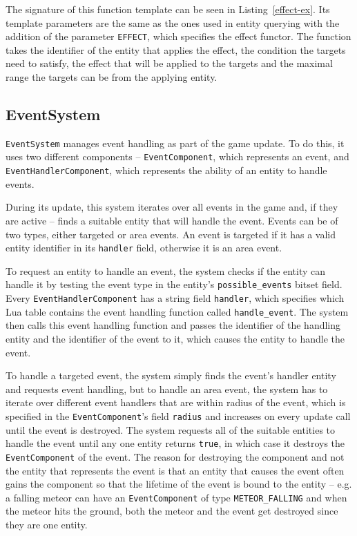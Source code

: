The signature of this function template can be seen in Listing~\ref{effect-ex}. Its template parameters are the same as the ones used
in entity querying with the addition of the parameter \texttt{EFFECT}, which specifies the effect functor. The function takes the
identifier of the entity that applies the effect, the condition the targets need to satisfy, the effect that will be applied to the
targets and the maximal range the targets can be from the applying entity.

\subsection{EventSystem}

\texttt{EventSystem} manages event handling as part of the game update. To do this, it uses two different components --
\texttt{EventComponent}, which represents an event, and \texttt{EventHandlerComponent}, which represents the ability of an entity
to handle events.

During its update, this system iterates over all events in the game and, if they are active -- finds a suitable entity that will
handle the event. Events can be of two types, either targeted or area events. An event is targeted if it has a valid entity
identifier in its \texttt{handler} field, otherwise it is an area event.

To request an entity to handle an event, the system checks if the entity can handle it by testing the event type in the entity's
\texttt{possible\_events} bitset field. Every \texttt{EventHandlerComponent} has a string field \texttt{handler}, which specifies
which Lua table contains the event handling function called \texttt{handle\_event}. The system then calls this event handling
function and passes the identifier of the handling entity and the identifier of the event to it, which causes the entity
to handle the event.

To handle a targeted event, the system simply finds the event's handler entity and requests event handling, but to handle an area event,
the system has to iterate over different event handlers that are within radius of the event, which is specified in the
\texttt{EventComponent}'s field \texttt{radius} and increases on every update call until the event is destroyed. The system requests
all of the suitable entities to handle the event until any one entity returns \texttt{true}, in which case it destroys the
\texttt{EventComponent} of the event. The reason for destroying the component and not the entity that represents the event is that
an entity that causes the event often gains the component so that the lifetime of the event is bound to the entity -- e.g. a falling
meteor can have an \texttt{EventComponent} of type \texttt{METEOR\_FALLING} and when the meteor hits the ground, both the meteor and
the event get destroyed since they are one entity.

